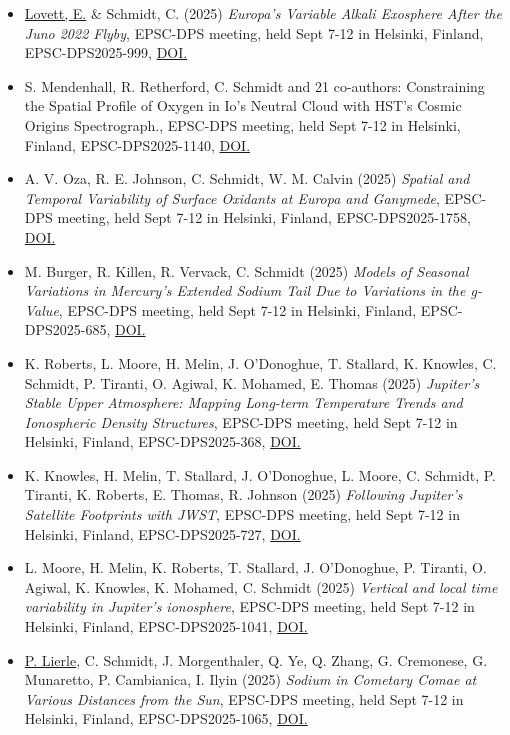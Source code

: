 \documentclass[12pt]{report}
\begin{document}
 \begin{itemize} \itemsep -2pt %
   \item \underline{Lovett, E.} \& Schmidt, C. (2025) \textit{Europa's Variable Alkali Exosphere After the Juno 2022 Flyby}, EPSC-DPS meeting, held Sept 7-12 in Helsinki, Finland, EPSC-DPS2025-999, \href{, https://doi.org/10.5194/epsc-dps2025-999}{DOI.}
  \item S. Mendenhall, R. Retherford, C. Schmidt and 21 co-authors: Constraining the Spatial Profile of Oxygen in Io’s Neutral Cloud with HST’s Cosmic Origins Spectrograph., EPSC-DPS meeting, held Sept 7-12 in Helsinki, Finland, EPSC-DPS2025-1140, \href{, https://doi.org/10.5194/epsc-dps2025-1140}{DOI.}
   \item A. V. Oza, R. E. Johnson, C. Schmidt, W. M. Calvin (2025) \textit{Spatial and Temporal Variability of Surface Oxidants at Europa and Ganymede}, EPSC-DPS meeting, held Sept 7-12 in Helsinki, Finland, EPSC-DPS2025-1758, \href{, https://doi.org/10.5194/epsc-dps2025-1758}{DOI.}
   \item M. Burger, R. Killen, R. Vervack, C. Schmidt (2025) \textit{Models of Seasonal Variations in Mercury's Extended Sodium Tail Due to Variations in the g-Value}, EPSC-DPS meeting, held Sept 7-12 in Helsinki, Finland, EPSC-DPS2025-685, \href{, https://doi.org/10.5194/epsc-dps2025-685}{DOI.}
   \item K. Roberts, L. Moore, H. Melin, J. O'Donoghue, T. Stallard, K. Knowles, C. Schmidt, P. Tiranti, O. Agiwal, K. Mohamed, E. Thomas (2025) \textit{Jupiter’s Stable Upper Atmosphere: Mapping Long-term Temperature Trends and Ionospheric Density Structures}, EPSC-DPS meeting, held Sept 7-12 in Helsinki, Finland, EPSC-DPS2025-368, \href{, https://doi.org/10.5194/epsc-dps2025-368}{DOI.}
   \item K. Knowles, H. Melin, T. Stallard, J. O'Donoghue, L. Moore, C. Schmidt, P. Tiranti, K. Roberts, E. Thomas, R. Johnson (2025) \textit{Following Jupiter's Satellite Footprints with JWST}, EPSC-DPS meeting, held Sept 7-12 in Helsinki, Finland, EPSC-DPS2025-727, \href{, https://doi.org/10.5194/epsc-dps2025-727}{DOI.}
   \item L. Moore, H. Melin, K. Roberts, T. Stallard, J. O'Donoghue, P. Tiranti, O. Agiwal, K. Knowles, K. Mohamed, C. Schmidt (2025) \textit{Vertical and local time variability in Jupiter's ionosphere}, EPSC-DPS meeting, held Sept 7-12 in Helsinki, Finland, EPSC-DPS2025-1041, \href{, https://doi.org/10.5194/epsc-dps2025-1041}{DOI.}
 \item \underline{P. Lierle}, C. Schmidt, J. Morgenthaler, Q. Ye, Q. Zhang, G. Cremonese, G. Munaretto, P. Cambianica, I. Ilyin (2025) \textit{Sodium in Cometary Comae at Various Distances from the Sun}, EPSC-DPS meeting, held Sept 7-12 in Helsinki, Finland, EPSC-DPS2025-1065, \href{, https://doi.org/10.5194/epsc-dps2025-1065}{DOI.}

\end{itemize}
\end{document}
